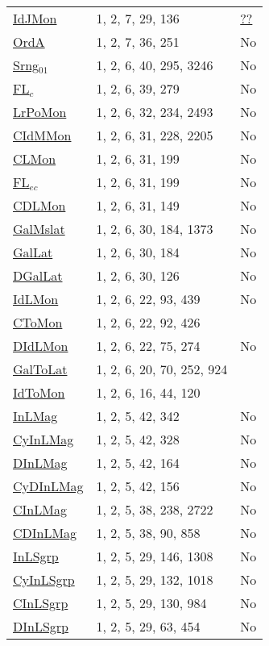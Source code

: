 {\begin{tabular}{|l|l|l|}
\hyperlink{IdJMon}{IdJMon}& 1, 2, 7, 29, 136 &\href{http://oeis.org/A307389}{??}\\
\hyperlink{OrdA}{OrdA}& 1, 2, 7, 36, 251 &No\\
\hyperlink{Srng$_{01}$}{Srng$_{01}$}& 1, 2, 6, 40, 295, 3246 &No\\
\hyperlink{FL$_c$}{FL$_c$}& 1, 2, 6, 39, 279 &No\\
\hyperlink{LrPoMon}{LrPoMon}& 1, 2, 6, 32, 234, 2493 &No\\
\hyperlink{CIdMMon}{CIdMMon}& 1, 2, 6, 31, 228, 2205 &No\\
\hyperlink{CLMon}{CLMon}& 1, 2, 6, 31, 199 &No\\
\hyperlink{FL$_{ec}$}{FL$_{ec}$}& 1, 2, 6, 31, 199 &No\\
\hyperlink{CDLMon}{CDLMon}& 1, 2, 6, 31, 149 &No\\
\hyperlink{GalMslat}{GalMslat}& 1, 2, 6, 30, 184, 1373 &No\\
\hyperlink{GalLat}{GalLat}& 1, 2, 6, 30, 184 &No\\
\hyperlink{DGalLat}{DGalLat}& 1, 2, 6, 30, 126 &No\\
\hyperlink{IdLMon}{IdLMon}& 1, 2, 6, 22, 93, 439 &No\\
\hyperlink{CToMon}{CToMon}& 1, 2, 6, 22, 92, 426 &\\
\hyperlink{DIdLMon}{DIdLMon}& 1, 2, 6, 22, 75, 274 &No\\
\hyperlink{GalToLat}{GalToLat}& 1, 2, 6, 20, 70, 252, 924 &\\
\hyperlink{IdToMon}{IdToMon}& 1, 2, 6, 16, 44, 120 &\\
\hyperlink{InLMag}{InLMag}& 1, 2, 5, 42, 342 &No\\
\hyperlink{CyInLMag}{CyInLMag}& 1, 2, 5, 42, 328 &No\\
\hyperlink{DInLMag}{DInLMag}& 1, 2, 5, 42, 164 &No\\
\hyperlink{CyDInLMag}{CyDInLMag}& 1, 2, 5, 42, 156 &No\\
\hyperlink{CInLMag}{CInLMag}& 1, 2, 5, 38, 238, 2722 &No\\
\hyperlink{CDInLMag}{CDInLMag}& 1, 2, 5, 38, 90, 858 &No\\
\hyperlink{InLSgrp}{InLSgrp}& 1, 2, 5, 29, 146, 1308 &No\\
\hyperlink{CyInLSgrp}{CyInLSgrp}& 1, 2, 5, 29, 132, 1018 &No\\
\hyperlink{CInLSgrp}{CInLSgrp}& 1, 2, 5, 29, 130, 984 &No\\
\hyperlink{DInLSgrp}{DInLSgrp}& 1, 2, 5, 29, 63, 454 &No\\

\end{tabular}}
